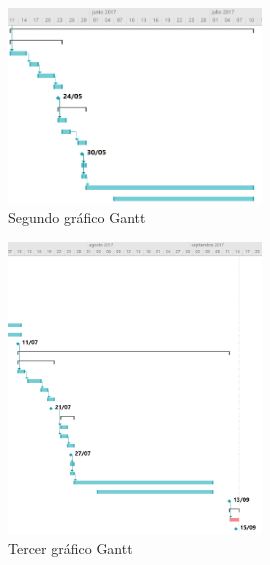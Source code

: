 \begin{figure}[h]
\begin{center}
\includegraphics[width=0.6\textwidth]{./img/Gantt2.png}
\end{center}
\caption{Segundo gráfico Gantt}
\label{tab:gantt2}
\end{figure}

\begin{figure}[H]
\begin{center}
\includegraphics[width=0.6\textwidth]{./img/Gantt3.png}
\end{center}
\caption{Tercer gráfico Gantt}
\label{tab:gantt3}
\end{figure}
